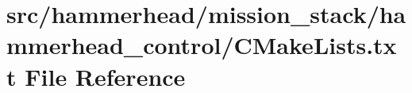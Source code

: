 \hypertarget{mission__stack_2hammerhead__control_2CMakeLists_8txt}{}\section{src/hammerhead/mission\+\_\+stack/hammerhead\+\_\+control/\+C\+Make\+Lists.txt File Reference}
\label{mission__stack_2hammerhead__control_2CMakeLists_8txt}
